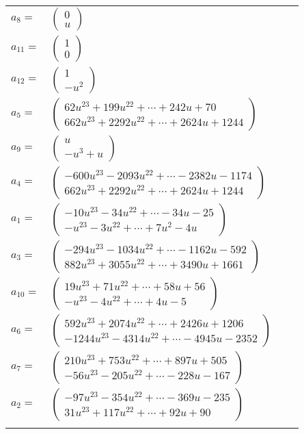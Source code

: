 \documentclass[1p]{elsarticle_modified}
\theoremstyle{definition}
\begin{document}
\begin{tabular}{m{7pt} m{180pt} m{7pt} m{180pt} }
\flushright $a_{8}=$&$\begin{pmatrix}0\\u\end{pmatrix}$ \\
\flushright $a_{11}=$&$\begin{pmatrix}1\\0\end{pmatrix}$ \\
\flushright $a_{12}=$&$\begin{pmatrix}1\\- u^2\end{pmatrix}$ \\
\flushright $a_{5}=$&$\begin{pmatrix}62 u^{23}+199 u^{22}+\cdots+242 u+70\\662 u^{23}+2292 u^{22}+\cdots+2624 u+1244\end{pmatrix}$ \\
\flushright $a_{9}=$&$\begin{pmatrix}u\\- u^3+u\end{pmatrix}$ \\
\flushright $a_{4}=$&$\begin{pmatrix}-600 u^{23}-2093 u^{22}+\cdots-2382 u-1174\\662 u^{23}+2292 u^{22}+\cdots+2624 u+1244\end{pmatrix}$ \\
\flushright $a_{1}=$&$\begin{pmatrix}-10 u^{23}-34 u^{22}+\cdots-34 u-25\\- u^{23}-3 u^{22}+\cdots+7 u^2-4 u\end{pmatrix}$ \\
\flushright $a_{3}=$&$\begin{pmatrix}-294 u^{23}-1034 u^{22}+\cdots-1162 u-592\\882 u^{23}+3055 u^{22}+\cdots+3490 u+1661\end{pmatrix}$ \\
\flushright $a_{10}=$&$\begin{pmatrix}19 u^{23}+71 u^{22}+\cdots+58 u+56\\- u^{23}-4 u^{22}+\cdots+4 u-5\end{pmatrix}$ \\
\flushright $a_{6}=$&$\begin{pmatrix}592 u^{23}+2074 u^{22}+\cdots+2426 u+1206\\-1244 u^{23}-4314 u^{22}+\cdots-4945 u-2352\end{pmatrix}$ \\
\flushright $a_{7}=$&$\begin{pmatrix}210 u^{23}+753 u^{22}+\cdots+897 u+505\\-56 u^{23}-205 u^{22}+\cdots-228 u-167\end{pmatrix}$ \\
\flushright $a_{2}=$&$\begin{pmatrix}-97 u^{23}-354 u^{22}+\cdots-369 u-235\\31 u^{23}+117 u^{22}+\cdots+92 u+90\end{pmatrix}$\\&\end{tabular}
\end{document}
